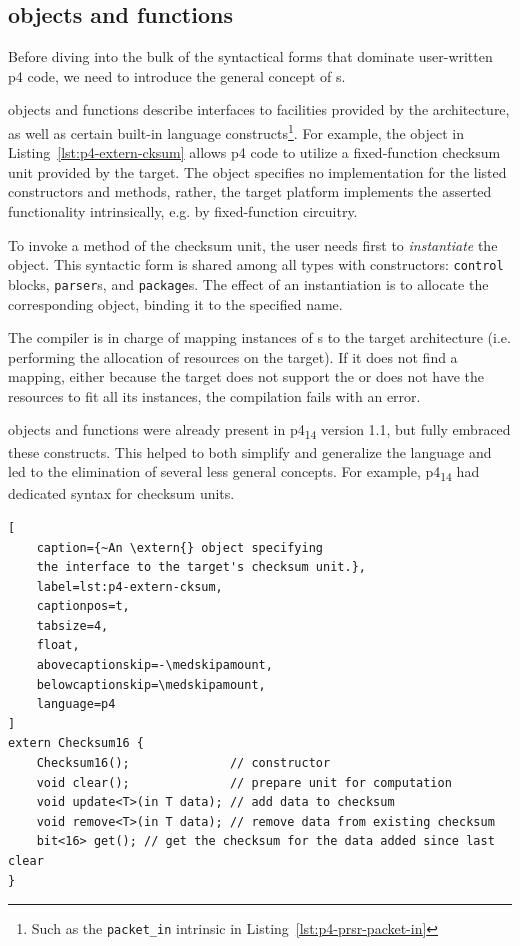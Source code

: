 \subsection*{\extern{} objects and functions}

Before diving into the bulk of the syntactical forms that dominate user-written
\acrshort{p4} code, we need to introduce the general concept of \extern{}s.

\extern{} objects and functions describe interfaces to facilities provided by
the architecture, as well as certain built-in language constructs\footnote{Such
as the \texttt{packet\_in} intrinsic in Listing~\ref{lst:p4-prsr-packet-in}}.
For example, the \extern{} object in Listing~\ref{lst:p4-extern-cksum} allows
\acrshort{p4} code to utilize a fixed-function checksum unit provided by the
target. The object specifies no implementation for the listed constructors and
methods, rather, the target platform implements the asserted functionality
intrinsically, e.g. by fixed-function circuitry.

To invoke a method of the checksum unit, the user needs first to
\emph{instantiate} the \extern{} object. This syntactic form is shared among all
types with constructors: \texttt{control} blocks, \texttt{parser}s, and
\texttt{package}s. The effect of an instantiation
is to allocate the corresponding object, binding it to the specified name.

The compiler is in charge of mapping instances of \extern{}s to the target
architecture (i.e. performing the allocation of resources on the target). If it
does not find a mapping, either because the target does not support the
\extern{} or does not have the resources to fit all its instances, the
compilation fails with an error.

\extern{} objects and functions were already present in
\acrshort{p4}\textsubscript{14} version 1.1, but \pfs fully embraced these
constructs. This helped to both simplify and generalize the language and led to
the elimination of several less general concepts. For example,
\acrshort{p4}\textsubscript{14} had dedicated syntax for checksum units.

\begin{lstlisting}[
	caption={~An \extern{} object specifying
	the interface to the target's checksum unit.},
	label=lst:p4-extern-cksum,
	captionpos=t,
	tabsize=4,
	float,
	abovecaptionskip=-\medskipamount,
	belowcaptionskip=\medskipamount,
	language=p4
]
extern Checksum16 {
	Checksum16();              // constructor
	void clear();              // prepare unit for computation
	void update<T>(in T data); // add data to checksum
	void remove<T>(in T data); // remove data from existing checksum
	bit<16> get(); // get the checksum for the data added since last clear
}
\end{lstlisting}

